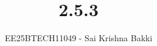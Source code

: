 \documentclass[journal]{IEEEtran}
\begin{document}

\vspace{3cm}

\title{2.5.3}
\author{EE25BTECH11049 - Sai Krishna Bakki}
 \maketitle
{\let\newpage\relax\maketitle}

\renewcommand{\thefigure}{\theenumi}
\renewcommand{\thetable}{\theenumi}
\setlength{\intextsep}{10pt} %


\renewcommand{\thetable}{\theenumi}
\end{document}
